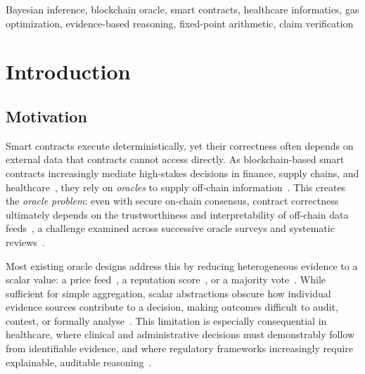 \documentclass[journal]{IEEEtran}
\theoremstyle{definition}
\theoremstyle{remark}
\begin{document}
\begin{IEEEkeywords}
Bayesian inference, blockchain oracle, smart contracts,
healthcare informatics, gas optimization, evidence-based
reasoning, fixed-point arithmetic, claim verification
\end{IEEEkeywords}

\section{Introduction}
\label{sec:introduction}

\subsection{Motivation}

Smart contracts execute deterministically, yet their
correctness often depends on external data that contracts
cannot access directly.
As blockchain-based smart contracts increasingly mediate
high-stakes decisions in finance, supply chains, and
healthcare~\cite{hameed2024digital}, they rely on
\emph{oracles} to supply off-chain
information~\cite{sheldon2021auditing}.
This creates the \emph{oracle problem}: even with secure
on-chain consensus, contract correctness ultimately depends
on the trustworthiness and interpretability of off-chain
data feeds~\cite{pasdar2023connect,caldarelli2021blockchain},
a challenge examined across successive oracle surveys and
systematic
reviews~\cite{albreiki2020trustworthy,mammadzada2019review,gutierrez2024oracles,beniiche2020study}.

Most existing oracle designs address this by reducing
heterogeneous evidence to a scalar value: a price
feed~\cite{zhang2024blockchain,ahmadjee2025decision}, a
reputation
score~\cite{chen2022decentralized,nelaturu2020public,arshad2022reputable,
wang2025efficient}, or a majority
vote~\cite{adler2018astraea,sober2021voting}.
While sufficient for simple aggregation, scalar abstractions
obscure how individual evidence sources contribute to a
decision, making outcomes difficult to audit, contest, or
formally analyse~\cite{pasdar2023connect,ezzat2022blockchain}.
This limitation is especially consequential in healthcare,
where clinical and administrative decisions must
demonstrably follow from identifiable evidence, and where
regulatory frameworks increasingly require explainable,
auditable reasoning~\cite{eu_mdr_2017,goodman2017right}.
\end{document}

